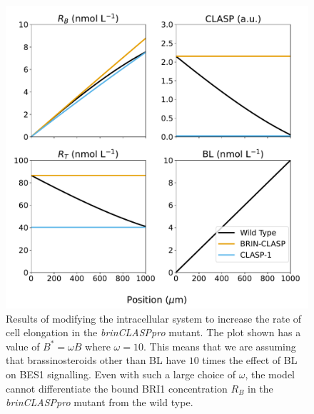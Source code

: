 \documentclass[referee,pdflatex,sn-mathphys-num]{sn-jnl}
\begin{document}
\begin{appendices}
\begin{figure}
  \centering
  \includegraphics[width=\textwidth]{bes1-mutants-modified.pdf}
  \caption{Results of modifying the intracellular system to increase the rate of cell elongation in the \emph{brinCLASPpro} mutant. The plot shown has a value of $B^{*} = \omega B$ where $\omega = 10$. This means that we are assuming that brassinosteroids other than BL have $10$ times the effect of BL on BES1 signalling. Even with such a large choice of $\omega$, the model cannot differentiate the bound BRI1 concentration $R_{B}$ in the \emph{brinCLASPpro} mutant from the wild type.}
  \label{bes1-mutants-modified}
\end{figure}


\end{appendices}
\end{document}
